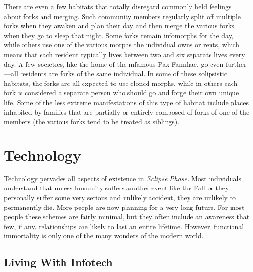 There are even a few habitats that totally disregard 
commonly held feelings about forks and merging. 
Such community members regularly split off multiple forks when they awaken and plan their day 
and then merge the various forks when they go to 
sleep that night. Some forks remain infomorphs for 
the day, while others use one of the various morphs 
the individual owns or rents, which means that each 
resident typically lives between two and six separate 
lives every day. A few societies, like the home of the 
infamous Pax Familiae, go even further—all residents 
are forks of the same individual. In some of these 
solipsistic habitats, the forks are all expected to use 
cloned morphs, while in others each fork is considered a separate person who should go and forge their 
own unique life. Some of the less extreme manifestations of this type of habitat include places inhabited 
by families that are partially or entirely composed of 
forks of one of the members (the various forks tend to 
be treated as siblings).

\section{Technology}

Technology pervades all aspects of existence in \textit{Eclipse }
\textit{Phase.} Most individuals understand that unless humanity suffers another event like the Fall or they personally suffer some very serious and unlikely accident, 
they are unlikely to permanently die. More people are 
now planning for a very long future. For most people 
these schemes are fairly minimal, but they often include an awareness that few, if any, relationships are 
likely to last an entire lifetime. However, functional 
immortality is only one of the many wonders of the 
modern world.

\subsection{Living With Infotech}

